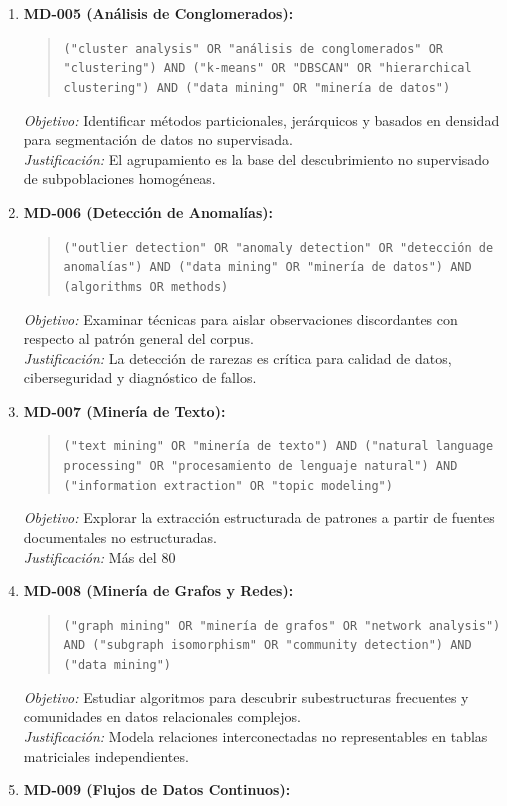 \begin{enumerate}
  \item \textbf{MD-005 (Análisis de Conglomerados):}
  \begin{quote}
  \texttt{("cluster analysis" OR "análisis de conglomerados" OR "clustering") AND ("k-means" OR "DBSCAN" OR "hierarchical clustering") AND ("data mining" OR "minería de datos")}
  \end{quote}
  \textit{Objetivo:} Identificar métodos particionales, jerárquicos y basados en densidad para segmentación de datos no supervisada.\\
  \textit{Justificación:} El agrupamiento es la base del descubrimiento no supervisado de subpoblaciones homogéneas.
  \item \textbf{MD-006 (Detección de Anomalías):}
  \begin{quote}
  \texttt{("outlier detection" OR "anomaly detection" OR "detección de anomalías") AND ("data mining" OR "minería de datos") AND (algorithms OR methods)}
  \end{quote}
  \textit{Objetivo:} Examinar técnicas para aislar observaciones discordantes con respecto al patrón general del corpus.\\
  \textit{Justificación:} La detección de rarezas es crítica para calidad de datos, ciberseguridad y diagnóstico de fallos.
  \item \textbf{MD-007 (Minería de Texto):}
  \begin{quote}
  \texttt{("text mining" OR "minería de texto") AND ("natural language processing" OR "procesamiento de lenguaje natural") AND ("information extraction" OR "topic modeling")}
  \end{quote}
  \textit{Objetivo:} Explorar la extracción estructurada de patrones a partir de fuentes documentales no estructuradas.\\
  \textit{Justificación:} Más del 80%
  \item \textbf{MD-008 (Minería de Grafos y Redes):}
  \begin{quote}
  \texttt{("graph mining" OR "minería de grafos" OR "network analysis") AND ("subgraph isomorphism" OR "community detection") AND ("data mining")}
  \end{quote}
  \textit{Objetivo:} Estudiar algoritmos para descubrir subestructuras frecuentes y comunidades en datos relacionales complejos.\\
  \textit{Justificación:} Modela relaciones interconectadas no representables en tablas matriciales independientes.
  \item \textbf{MD-009 (Flujos de Datos Continuos):}

\end{enumerate}
